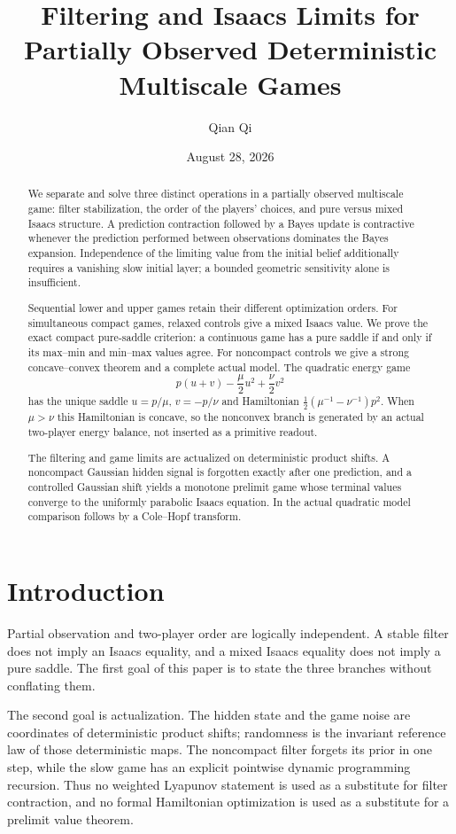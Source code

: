 \documentclass[11pt,reqno]{amsart}
\title[Filtering and Isaacs limits]{Filtering and Isaacs Limits for Partially Observed Deterministic Multiscale Games}
\author{Qian Qi}
\date{August 28, 2026}
\theoremstyle{definition}
\theoremstyle{remark}
\begin{document}
\begin{abstract}
We separate and solve three distinct operations in a partially observed
multiscale game: filter stabilization, the order of the players' choices, and
pure versus mixed Isaacs structure.  A prediction contraction followed by a
Bayes update is contractive whenever the prediction performed between
observations dominates the Bayes expansion.  Independence of the limiting
value from the initial belief additionally requires a vanishing slow initial
layer; a bounded geometric sensitivity alone is insufficient.

Sequential lower and upper games retain their different optimization orders.
For simultaneous compact games, relaxed controls give a mixed Isaacs value.
We prove the exact compact pure-saddle criterion: a continuous game has a pure
saddle if and only if its max--min and min--max values agree.  For noncompact
controls we give a strong concave--convex theorem and a complete actual model.
The quadratic energy game
\[
 p(u+v)-\frac\mu2u^2+\frac\nu2v^2
\]
has the unique saddle $u=p/\mu$, $v=-p/\nu$ and Hamiltonian
$\frac12(\mu^{-1}-\nu^{-1})p^2$.  When $\mu>\nu$ this Hamiltonian is concave,
so the nonconvex branch is generated by an actual two-player energy balance,
not inserted as a primitive readout.

The filtering and game limits are actualized on deterministic product shifts.
A noncompact Gaussian hidden signal is forgotten exactly after one prediction,
and a controlled Gaussian shift yields a monotone prelimit game whose terminal
values converge to the uniformly parabolic Isaacs equation.  In the actual
quadratic model comparison follows by a Cole--Hopf transform.
\end{abstract}

\maketitle
\tableofcontents

\section{Introduction}

Partial observation and two-player order are logically independent.  A stable
filter does not imply an Isaacs equality, and a mixed Isaacs equality does not
imply a pure saddle.  The first goal of this paper is to state the three
branches without conflating them.

The second goal is actualization.  The hidden state and the game noise are
coordinates of deterministic product shifts; randomness is the invariant
reference law of those deterministic maps.  The noncompact filter forgets its
prior in one step, while the slow game has an explicit pointwise dynamic
programming recursion.  Thus no weighted Lyapunov statement is used as a
substitute for filter contraction, and no formal Hamiltonian optimization is
used as a substitute for a prelimit value theorem.
\end{document}
